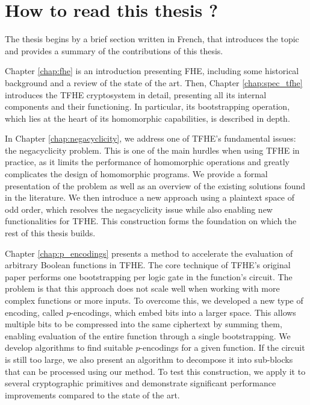 
\chapter*{How to read this thesis ?}

The thesis begins by a brief section written in French, that introduces the topic and provides a summary of the contributions of this thesis.

Chapter \ref{chap:fhe} is an introduction presenting \gls{FHE}, including some historical background and a review of the state of the art. Then, Chapter \ref{chap:spec_tfhe} introduces the \gls{TFHE} cryptosystem in detail, presenting all its internal components and their functioning. In particular, its bootstrapping operation, which lies at the heart of its homomorphic capabilities, is described in depth.

In Chapter \ref{chap:negacyclicity}, we address one of \gls{TFHE}’s fundamental issues: the negacyclicity problem. This is one of the main hurdles when using \gls{TFHE} in practice, as it limits the performance of homomorphic operations and greatly complicates the design of homomorphic programs. We provide a formal presentation of the problem as well as an overview of the existing solutions found in the literature. We then introduce a new approach using a plaintext space of odd order, which resolves the negacyclicity issue while also enabling new functionalities for \gls{TFHE}. This construction forms the foundation on which the rest of this thesis builds.

Chapter \ref{chap:p_encodings} presents a method to accelerate the evaluation of arbitrary Boolean functions in \gls{TFHE}. The core technique of \gls{TFHE}’s original paper performs one bootstrapping per logic gate in the function’s circuit. The problem is that this approach does not scale well when working with more complex functions or more inputs. To overcome this, we developed a new type of encoding, called $p$-encodings, which embed bits into a larger space. This allows multiple bits to be compressed into the same ciphertext by summing them, enabling evaluation of the entire function through a single bootstrapping. We develop algorithms to find suitable $p$-encodings for a given function. If the circuit is still too large, we also present an algorithm to decompose it into sub-blocks that can be processed using our method. To test this construction, we apply it to several cryptographic primitives and demonstrate significant performance improvements compared to the state of the art.

